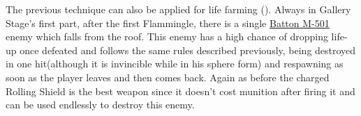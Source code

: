 The previous technique can also be applied for life farming (). Always in Gallery Stage's first part, after the first Flammingle, there is a single \hyperlink{enem:Batton_M-501}{Batton M-501}  enemy which falls from the roof. This enemy has a high chance of dropping life-up once defeated and follows the same rules described previously, being destroyed in one hit(although it is invincible while in his sphere form) and respawning as soon as the player leaves and then comes back. Again as before the charged Rolling Shield is the best weapon since it doesn't cost munition after firing it and can be used endlessly to destroy this enemy.
